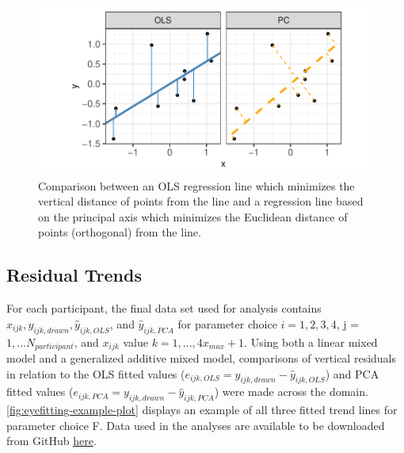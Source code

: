 \documentclass[12pt]{article}
\begin{document}
\begin{figure}[tbp]

{\centering \includegraphics[width=0.8\linewidth,]{Eye-Fitting-Straight-Lines-in-the-Modern-Era_files/figure-latex/ols-vs-pca-example-1} 

}

\caption{ Comparison between an OLS regression line which minimizes the vertical distance of points from the line and a regression line based on the principal axis which minimizes the Euclidean distance of points (orthogonal) from the line.}\label{fig:ols-vs-pca-example}
\end{figure}

\hypertarget{residual-trends}{%
\subsection{Residual Trends}\label{residual-trends}}

For each participant, the final data set used for analysis contains
\(x_{ijk}, y_{ijk,drawn}, \hat y_{ijk,OLS}\), and \(\hat y_{ijk,PCA}\)
for parameter choice \(i = 1,2,3,4\), j = \(1,...N_{participant}\), and
\(x_{ijk}\) value \(k = 1, ...,4 x_{max} + 1\). Using both a linear
mixed model and a generalized additive mixed model, comparisons of
vertical residuals in relation to the OLS fitted values
(\(e_{ijk,OLS} = y_{ijk,drawn} - \hat y_{ijk,OLS}\)) and PCA fitted
values (\(e_{ijk,PCA} = y_{ijk,drawn} - \hat y_{ijk,PCA}\)) were made
across the domain. \cref{fig:eyefitting-example-plot} displays an
example of all three fitted trend lines for parameter choice F. Data
used in the analyses are available to be downloaded from GitHub
\href{https://github.com/earobinson95/Eye-Fitting-Straight-Lines-in-the-Modern-Era/raw/main/data/youdrawit-eyefitting-model-data.csv}{here}.
\end{document}
